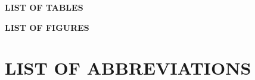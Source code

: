 \documentclass[12pt,a4paper,oneside]{report}
\numberwithin{equation}{chapter}
\numberwithin{figure}{chapter}
\numberwithin{table}{chapter}
\begin{document}
\vspace*{1in}
\begin{center}
\hspace*{-0.25in}
\begin{minipage}{\dimexpr\textwidth+0.5in\relax}
\centering
{\fontsize{14}{16}\selectfont\bfseries LIST OF TABLES}
\end{minipage}
\end{center}
\vspace{1cm}
\makeatletter
{}
\makeatother
\newpage

\vspace*{1in}
\begin{center}
\hspace*{-0.25in}
\begin{minipage}{\dimexpr\textwidth+0.5in\relax}
\centering
{\fontsize{14}{16}\selectfont\bfseries LIST OF FIGURES}
\end{minipage}
\end{center}
\vspace{1cm}
\makeatletter
{}
\makeatother
\newpage


\chapter*{LIST OF ABBREVIATIONS}

\vspace{0.5cm}
\end{document}
